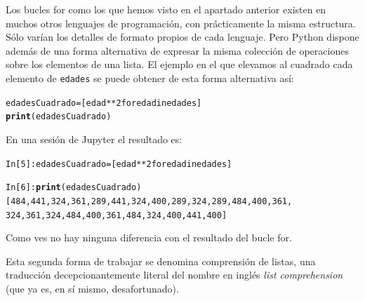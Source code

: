 \documentclass[10pt,a4paper]{article}\usepackage[]{graphicx}\usepackage[]{color}
\makeatletter
\newcommand{\hlkwd}[1]{\textcolor[rgb]{0.737,0.353,0.396}{\textbf{#1}}}%
\newenvironment{kframe}{%
 \def\at@end@of@kframe{}%
 \ifinner\ifhmode%
  \def\at@end@of@kframe{\end{minipage}}%
  \begin{minipage}{\columnwidth}%
 \fi\fi%
 \def\FrameCommand##1{\hskip\@totalleftmargin \hskip-\fboxsep
 \colorbox{shadecolor}{##1}\hskip-\fboxsep
     \hskip-\linewidth \hskip-\@totalleftmargin \hskip\columnwidth}%
 \MakeFramed {\advance\hsize-\width
   \@totalleftmargin\z@ \linewidth\hsize
   \@setminipage}}%
 {\par\unskip\endMakeFramed%
 \at@end@of@kframe}
\newenvironment{knitrout}{}{} %
\makeatother
\begin{document}
Los bucles for como los que hemos visto en el apartado anterior existen en muchos otros lenguajes de programación, con prácticamente la misma estructura. Sólo varían los detalles de formato propios de cada lenguaje. Pero Python dispone además de una forma alternativa de expresar la misma colección de operaciones sobre los elementos de una lista. El ejemplo en el que elevamos al cuadrado cada elemento de {\tt edades} se puede obtener de esta forma alternativa así:
\begin{knitrout}
\color{fgcolor}\begin{kframe}
\begin{alltt}
edadesCuadrado = [edad**2 for edad in edades]
\hlkwd{print}(edadesCuadrado)
\end{alltt}
\end{kframe}
\end{knitrout}
En una sesión de Jupyter el resultado es:
\begin{knitrout}
\color{fgcolor}\begin{kframe}
\begin{alltt}
In [5]: edadesCuadrado = [edad**2 for edad in edades]

In [6]: \hlkwd{print}(edadesCuadrado)
[484, 441, 324, 361, 289, 441, 324, 400, 289, 324, 289, 484, 400, 361,
324, 361, 324, 484, 400, 361, 484, 324, 400, 441, 400]
\end{alltt}
\end{kframe}
\end{knitrout}

Como ves no hay ninguna diferencia con el resultado del bucle for.

Esta segunda forma de trabajar se denomina {\sf comprensión de listas}, una traducción decepcionantemente literal del nombre en inglés {\em list comprehension} (que ya es, en sí mismo, desafortunado).
\end{document}
